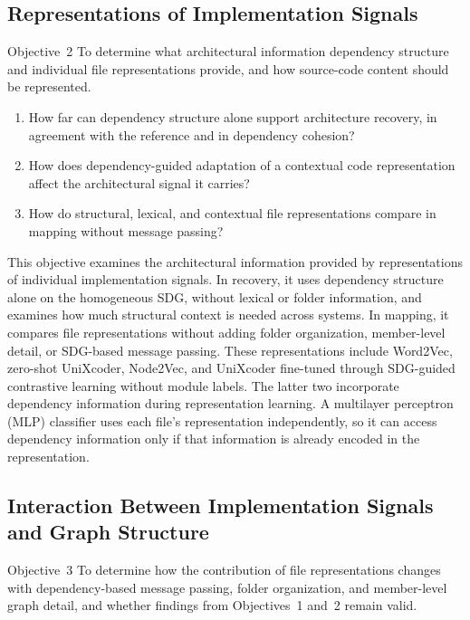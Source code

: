 \subsection{Representations of Implementation Signals}
\label{sec:obj_2}

\begin{GrayBox}{Objective~2}
To determine what architectural information dependency structure and individual file representations provide, and how source-code content should be represented.
\end{GrayBox}
\begin{enumerate}[label=RQ2.\arabic*, leftmargin=3em, itemsep=-0.05pt]
    \item How far can dependency structure alone support architecture recovery, in agreement with the reference and in dependency cohesion?
    \item How does dependency-guided adaptation of a contextual code representation affect the architectural signal it carries?
    \item How do structural, lexical, and contextual file representations compare in mapping without message passing?
\end{enumerate}
This objective examines the architectural information provided by representations of individual implementation signals. In recovery, it uses dependency structure alone on the homogeneous SDG, without lexical or folder information, and examines how much structural context is needed across systems. In mapping, it compares file representations without adding folder organization, member-level detail, or SDG-based message passing. These representations include Word2Vec, zero-shot UniXcoder, Node2Vec, and UniXcoder fine-tuned through SDG-guided contrastive learning without module labels. The latter two incorporate dependency information during representation learning. A multilayer perceptron (MLP) classifier uses each file's representation independently, so it can access dependency information only if that information is already encoded in the representation.
\subsection[Implementation Signals and Graph Structure]{Interaction Between Implementation Signals and Graph Structure}
\label{sec:obj_3}

\begin{GrayBox}{Objective~3}
To determine how the contribution of file representations changes with dependency-based message passing, folder organization, and member-level graph detail, and whether findings from Objectives~1 and~2 remain valid.
\end{GrayBox}

